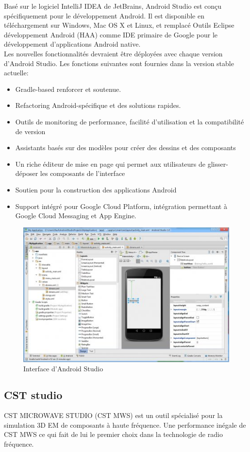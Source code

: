 \documentclass[11pt, a4paper, twoside]{book}
\begin{document}
Basé sur le logiciel IntelliJ IDEA de JetBrains, Android Studio est conçu spécifiquement pour le développement Android. Il est disponible en téléchargement sur Windows, Mac OS X et Linux, et remplacé Outils Eclipse développement Android (HAA) comme IDE primaire de Google pour le développement d'applications Android native.\\


Les nouvelles fonctionnalités devraient être déployées avec chaque version d'Android Studio. Les fonctions suivantes sont fournies dans la version stable actuelle: 
\begin{itemize}
\item Gradle-based  renforcer et soutenue.
\item Refactoring Android-spécifique et des solutions rapides.
\item Outils de monitoring de performance, facilité d'utilisation et la compatibilité de version 
\item Assistants basés sur des modèles pour créer des dessins et des composants 
\item Un riche éditeur de mise en page qui permet aux utilisateurs de glisser-déposer les composants de l'interface
\item Soutien pour la construction des applications Android
\item Support intégré pour Google Cloud Platform, intégration permettant à Google Cloud Messaging et App Engine.
\end{itemize}
\begin{figure}[H]
\centering
\includegraphics[width=\textwidth]{as}
\caption{Interface d'Android Studio}
\end{figure}

\subsection{CST studio}
CST MICROWAVE STUDIO (CST MWS) est un outil spécialisé pour la simulation 3D EM de composants à haute fréquence. Une performance inégale de CST MWS  ce qui fait de lui le premier choix dans la technologie de radio fréquence.\\
\end{document}
